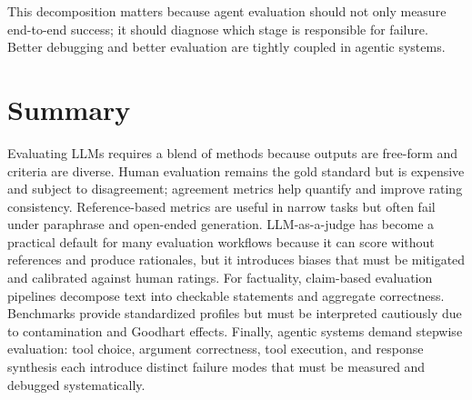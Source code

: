 This decomposition matters because agent evaluation should not only measure end-to-end success; it should diagnose which stage is responsible for failure. Better debugging and better evaluation are tightly coupled in agentic systems.

\section{Summary}
Evaluating LLMs requires a blend of methods because outputs are free-form and criteria are diverse. Human evaluation remains the gold standard but is expensive and subject to disagreement; agreement metrics help quantify and improve rating consistency. Reference-based metrics are useful in narrow tasks but often fail under paraphrase and open-ended generation. LLM-as-a-judge has become a practical default for many evaluation workflows because it can score without references and produce rationales, but it introduces biases that must be mitigated and calibrated against human ratings. For factuality, claim-based evaluation pipelines decompose text into checkable statements and aggregate correctness. Benchmarks provide standardized profiles but must be interpreted cautiously due to contamination and Goodhart effects. Finally, agentic systems demand stepwise evaluation: tool choice, argument correctness, tool execution, and response synthesis each introduce distinct failure modes that must be measured and debugged systematically.
